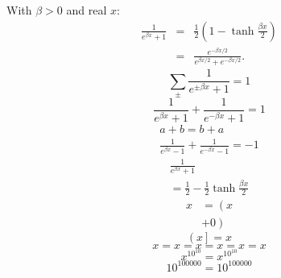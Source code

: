 \documentclass{article}
\begin{document}
With $\beta>0$ and real $x$:
\begin{eqnarray}
\frac{1}{e^{\beta x}+1} &=& \frac{1}{2}\left(1-\tanh\frac{\beta x}{2}\right) \nonumber\\
&=& \frac{e^{-\beta x/2}}{e^{\beta x/2}+e^{-\beta x/2}} .
\label{eq:e1}
\end{eqnarray}
\[ \sum_{\pm} \frac{1}{e^{\pm\beta x}+1} = 1 \]
$$ \frac{1}{e^{\beta x}+1} + \frac{1}{e^{-\beta x}+1} = 1 $$
\begin{gather}
a+b = b+a \\
\frac{1}{e^{\beta x}-1} + \frac{1}{e^{-\beta x}-1} = -1
\end{gather}
\begin{multline}
\frac{1}{e^{\beta x}+1} \\
= \frac{1}{2} - \frac{1}{2}\tanh\frac{\beta x}{2}
\end{multline}
\begin{align*}
x &= \left(x \right. \\
& \left. + 0\right)
\end{align*}
\begin{equation}
\left( x \right]  = x
\end{equation}
\begin{equation}
x = x = x = x = x = x
\end{equation}
\begin{equation}
\end{equation}
\begin{equation}
\label{eq:empty}
\end{equation}
\begin{equation}
x^{10^{10}} = x^{10^{10}}
\end{equation}
\begin{equation}
10^{100000} = 10^{100000}
\end{equation}
\end{document}
